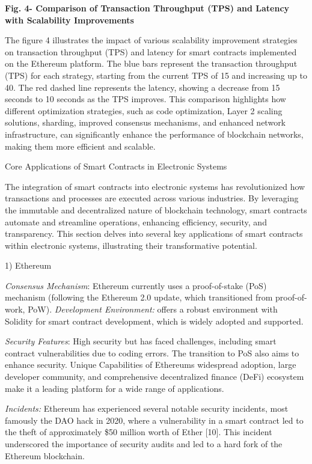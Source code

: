 {\bfseries Fig. 4- Comparison of Transaction Throughput (TPS) and Latency
with Scalability Improvements}

The figure 4 illustrates the impact of various scalability improvement
strategies on transaction throughput (TPS) and latency for smart
contracts implemented on the Ethereum platform. The blue bars represent
the transaction throughput (TPS) for each strategy, starting from the
current TPS of 15 and increasing up to 40. The red dashed line
represents the latency, showing a decrease from 15 seconds to 10 seconds
as the TPS improves. This comparison highlights how different
optimization strategies, such as code optimization, Layer 2 scaling
solutions, sharding, improved consensus mechanisms, and enhanced network
infrastructure, can significantly enhance the performance of blockchain
networks, making them more efficient and scalable.

Core Applications of Smart Contracts in Electronic Systems

The integration of smart contracts into electronic systems has
revolutionized how transactions and processes are executed across
various industries. By leveraging the immutable and decentralized nature
of blockchain technology, smart contracts automate and streamline
operations, enhancing efficiency, security, and transparency. This
section delves into several key applications of smart contracts within
electronic systems, illustrating their transformative potential.

1) Ethereum

\emph{Consensus Mechanism}: Ethereum currently uses a proof-of-stake
(PoS) mechanism (following the Ethereum 2.0 update, which transitioned
from proof-of-work, PoW). \emph{Development Environment:} offers a
robust environment with Solidity for smart contract development, which
is widely adopted and supported.

\emph{Security Features}: High security but has faced challenges,
including smart contract vulnerabilities due to coding errors. The
transition to PoS also aims to enhance security. Unique Capabilities of
Ethereum\textquotesingle s widespread adoption, large developer
community, and comprehensive decentralized finance (DeFi) ecosystem make
it a leading platform for a wide range of applications.

\emph{Incidents:} Ethereum has experienced several notable security
incidents, most famously the DAO hack in 2020, where a vulnerability in
a smart contract led to the theft of approximately \$50 million worth of
Ether {[}10{]}. This incident underscored the importance of security
audits and led to a hard fork of the Ethereum blockchain.

